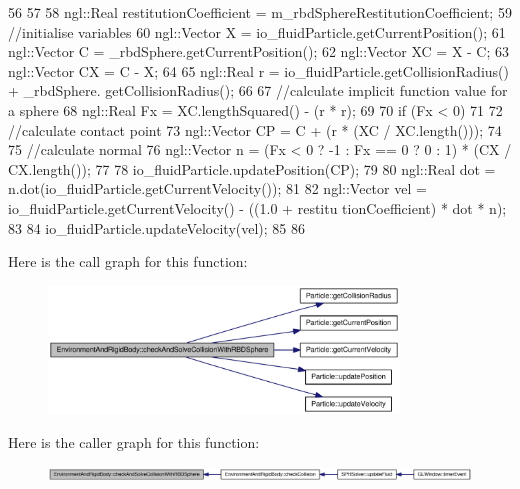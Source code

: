 \begin{DoxyCode}
56 {
57 
58     ngl::Real restitutionCoefficient = m_rbdSphereRestitutionCoefficient;
59     //initialise variables
60     ngl::Vector X = io_fluidParticle.getCurrentPosition();
61     ngl::Vector C = _rbdSphere.getCurrentPosition();
62     ngl::Vector XC = X - C;
63     ngl::Vector CX = C - X;
64 
65     ngl::Real r = io_fluidParticle.getCollisionRadius() + _rbdSphere.
      getCollisionRadius();
66 
67     //calculate implicit function value for a sphere
68     ngl::Real Fx = XC.lengthSquared() - (r * r);
69 
70     if (Fx < 0)
71     {
72         //calculate contact point
73         ngl::Vector CP = C + (r * (XC / XC.length()));
74 
75         //calculate normal
76         ngl::Vector n = (Fx < 0 ? -1 : Fx == 0 ? 0 : 1) * (CX / CX.length());
77 
78         io_fluidParticle.updatePosition(CP);
79 
80         ngl::Real dot = n.dot(io_fluidParticle.getCurrentVelocity());
81 
82         ngl::Vector vel = io_fluidParticle.getCurrentVelocity() - ((1.0 + restitu
      tionCoefficient) * dot * n);
83 
84         io_fluidParticle.updateVelocity(vel);
85     }
86 }
\end{DoxyCode}




Here is the call graph for this function:\nopagebreak
\begin{figure}[H]
\begin{center}
\leavevmode
\includegraphics[width=264pt]{class_environment_and_rigid_body_acfad78cb6ae8ab9d7fb04479c98a618e_cgraph}
\end{center}
\end{figure}




Here is the caller graph for this function:\nopagebreak
\begin{figure}[H]
\begin{center}
\leavevmode
\includegraphics[width=420pt]{class_environment_and_rigid_body_acfad78cb6ae8ab9d7fb04479c98a618e_icgraph}
\end{center}
\end{figure}


